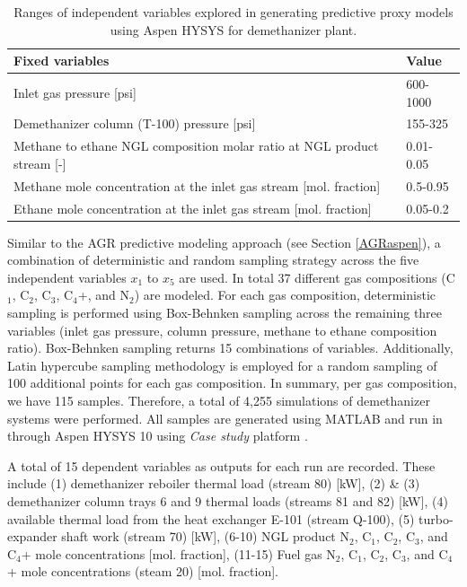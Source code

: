\documentclass[11pt]{report}
\begin{document}
\begin{table}
\begin{scriptsize}
\caption{Ranges of independent variables explored in generating predictive proxy models using Aspen HYSYS for demethanizer plant.}
\label{tab:demethanizer_aspen2}
\begin{tabular*}{1\columnwidth}{p{}p{}}
\toprule
Fixed variables & Value\\
\midrule
Inlet gas pressure {[}psi{]} & 600-1000   \\
Demethanizer column (T-100) pressure {[}psi{]}                                             & 155-325      \\
Methane to ethane NGL composition molar ratio at NGL product stream {[}-{]}                                 & 0.01-0.05    \\
Methane mole concentration at the inlet gas stream {[}mol. fraction{]}                                                           & 0.5-0.95   \\
Ethane mole concentration at the inlet gas stream {[}mol. fraction{]}                                                    & 0.05-0.2  \\
\bottomrule
\end{tabular*}
\end{scriptsize}
\end{table}

Similar to the AGR predictive modeling approach (see Section \ref{AGRaspen}), a combination of deterministic and random sampling strategy across the five independent variables $x_1$ to $x_5$ are used. In total 37 different gas compositions (C$_1$, C$_2$, C$_3$, C$_4$+, and N$_2$) are modeled. For each gas composition, deterministic sampling is performed using Box-Behnken sampling across the remaining three variables (inlet gas pressure, column pressure, methane to ethane composition ratio). Box-Behnken sampling returns 15 combinations of variables. Additionally, Latin hypercube sampling methodology is employed for a random sampling of 100 additional points for each gas composition. In summary, per gas composition, we have 115 samples. Therefore, a total of 4,255 simulations of demethanizer systems were performed. All samples are generated using MATLAB \cite{Mathworks2016} and run in through Aspen HYSYS 10 using \emph{Case study} platform \cite{Masnadi2020}.

A total of 15 dependent variables as outputs for each run are recorded. These include (1) demethanizer reboiler thermal load (stream 80) [kW], (2) \& (3) demethanizer column trays 6 and 9 thermal loads (streams 81 and 82) [kW], (4) available thermal load from the heat exchanger E-101 (stream Q-100), (5) turbo-expander shaft work (stream 70) [kW], (6-10) NGL product N$_2$, C$_1$, C$_2$, C$_3$, and C$_4$+ mole concentrations [mol. fraction], (11-15) Fuel gas N$_2$, C$_1$, C$_2$, C$_3$, and C$_4$+ mole concentrations (steam 20) [mol. fraction].
\end{document}
